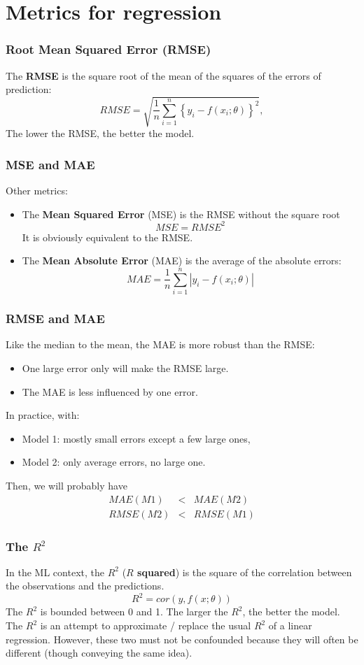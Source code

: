 \section{Metrics for regression}
\begin{frame}
\frametitle{Root Mean Squared Error (RMSE)}
The {\bf RMSE} is the square root of the mean of the squares of the errors of prediction:
$$
RMSE = \sqrt{\frac{1}{n} \sum_{i=1}^n \left\{y_i - f(x_i;\theta)\right\}^2},
$$
The lower the RMSE, the better the model.
\end{frame}
\begin{frame}
\frametitle{MSE and MAE}
Other metrics:
\begin{itemize}
\item The {\bf Mean Squared Error} (MSE) is the RMSE without the square root
$$
MSE = RMSE^2
$$
It is obviously equivalent to the RMSE.
\item The {\bf Mean Absolute Error} (MAE) is the average of the absolute errors:
$$
MAE = \frac{1}{n}\sum_{i=1}^n|y_i -f(x_i;\theta)|
$$
\end{itemize}
\end{frame}
\begin{frame}
\frametitle{RMSE and MAE}
Like the median to the mean, the MAE is more robust than the RMSE:
\begin{itemize}
\item One large error only will make the RMSE large.
\item The MAE is less influenced by one error.
\end{itemize}
In practice, with:
\begin{itemize}
\item Model 1: mostly small errors except a few large ones,
\item Model 2: only average errors, no large one.
\end{itemize}
Then, we will probably have
\begin{eqnarray*}
MAE(M1) &<& MAE(M2)\\
RMSE(M2) &<& RMSE(M1)
\end{eqnarray*}
\end{frame}
\begin{frame}[fragile]
\frametitle{The $R^2$}
In the ML context, the $R^2$ ({\bf $R$ squared}) is the square of the correlation between the observations and the predictions. 
$$
R^2 = cor(y,f(x;\theta))
$$
The $R^2$ is bounded between 0 and 1. The larger the $R^2$, the better the model.\\
\vspace{0.3cm}
The $R^2$ is an attempt to approximate / replace the usual $R^2$ of a linear regression. However, these two must not be confounded because they will often be different (though conveying the same idea).
\end{frame}
